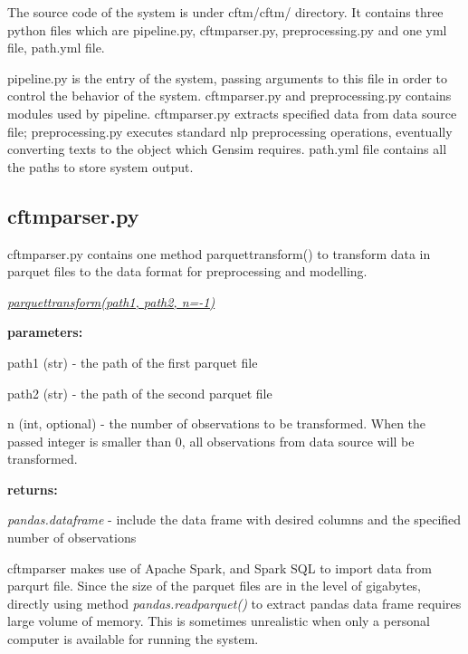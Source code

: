 \documentclass{article} %
\begin{document}
    The source code of the system is under cftm/cftm/ directory. It contains three python files which are pipeline.py, cftm\textunderscore{}parser.py, preprocessing.py and one yml file, path.yml file.

    pipeline.py is the entry of the system, passing arguments to this file in order to control the behavior of the system. cftm\textunderscore{}parser.py and preprocessing.py contains modules used by pipeline. cftm\textunderscore{}parser.py extracts specified data from data source file; preprocessing.py executes standard nlp preprocessing operations, eventually converting texts to the object which Gensim requires. path.yml file contains all the paths to store system output.

    \subsection{cftm\textunderscore{}parser.py}
    cftm\textunderscore{}parser.py contains one method parquet\textunderscore{}transform() to transform data in parquet files to the data format for preprocessing and modelling.

    \underline{\textit{parquet\textunderscore{}transform(path1, path2, n=-1)}}

    \textbf{parameters: }
    \begin{compactitem}
        \item path1 (str) - the path of the first parquet file
        \item path2 (str) - the path of the second parquet file
        \item n (int, optional) - the number of observations to be transformed. When the passed integer is smaller than 0, all observations from data source will be transformed.
    \end{compactitem}

    \textbf{returns:}
    \begin{compactitem}
        \item \textit{pandas.dataframe} - include the data frame with desired columns and the specified number of observations
    \end{compactitem}


    cftm\textunderscore{}parser makes use of Apache Spark, and Spark SQL to import data from parqurt file. Since the size of the parquet files are in the level of gigabytes, directly using method \textit{pandas.read\textunderscore{}parquet()} to extract pandas data frame requires large volume of memory. This is sometimes unrealistic when only a personal computer is available for running the system.
\end{document}
